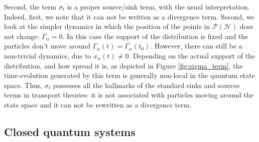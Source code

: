 \documentclass[draft,nofootinbib,pre,twocolumn,showpacs,showkeys,preprintnumbers,floatfix]{revtex4-1}
\newcommand{\1}{\mathbbm{1}}
\newcommand{\PH}{\mathcal{P}(\mathcal{H})}
\begin{document}
Second, the term $\sigma_t$ is a proper source/sink term, with the usual interpretation. Indeed, first, we note that it
can not be written as a divergence term. Second, we look at the simpler dynamics in which the position of the points 
in $\PH$ does not change: $\dot{\Gamma}_\alpha = 0$. In this case the support of the distribution is fixed and the 
particles don't move around $\Gamma_\alpha(t)=\Gamma_\alpha(t_0)$. However, there can still be a non-trivial 
dynamics, due to $\dot{x}_\alpha(t)\neq 0$. Depending on the actual support of the distribution, and how spread it is, 
as depicted in Figure \ref{fig:sigma_term}, the time-evolution generated by this term is generally non-local in the 
quantum state space. Thus, $\sigma_t$ possesses all the hallmarks of the standard sinks and sources terms in 
transport theories: it is not associated with particles moving around the state space and it can not be rewritten 
as a divergence term.

\subsection*{Closed quantum systems}
\end{document}
